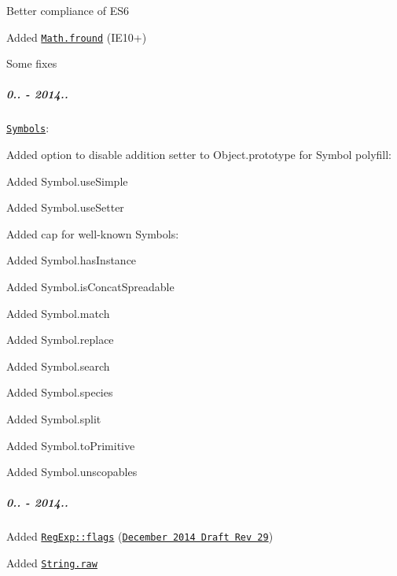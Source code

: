 \begin{DoxyItemize}
\item Better compliance of E\+S6
\item Added \href{https://github.com/zloirock/core-js/#ecmascript-6-math}{\tt {\ttfamily Math.\+fround}} (I\+E10+)
\item Some fixes
\end{DoxyItemize}

\subparagraph*{0.. -\/ 2014..}


\begin{DoxyItemize}
\item \href{https://github.com/zloirock/core-js/#ecmascript-6-symbol}{\tt Symbols}\+:
\begin{DoxyItemize}
\item Added option to disable addition setter to {\ttfamily Object.\+prototype} for Symbol polyfill\+:
\begin{DoxyItemize}
\item Added {\ttfamily Symbol.\+use\+Simple}
\item Added {\ttfamily Symbol.\+use\+Setter}
\end{DoxyItemize}
\item Added cap for well-\/known Symbols\+:
\begin{DoxyItemize}
\item Added {\ttfamily Symbol.\+has\+Instance}
\item Added {\ttfamily Symbol.\+is\+Concat\+Spreadable}
\item Added {\ttfamily Symbol.\+match}
\item Added {\ttfamily Symbol.\+replace}
\item Added {\ttfamily Symbol.\+search}
\item Added {\ttfamily Symbol.\+species}
\item Added {\ttfamily Symbol.\+split}
\item Added {\ttfamily Symbol.\+to\+Primitive}
\item Added {\ttfamily Symbol.\+unscopables}
\end{DoxyItemize}
\end{DoxyItemize}
\end{DoxyItemize}

\subparagraph*{0.. -\/ 2014..}


\begin{DoxyItemize}
\item Added \href{https://github.com/zloirock/core-js/#ecmascript-6-regexp}{\tt {\ttfamily Reg\+Exp\+::flags}} (\href{http://wiki.ecmascript.org/doku.php?id=harmony:specification_drafts#december_6_2014_draft_rev_29}{\tt December 2014 Draft Rev 29})
\item Added \href{https://github.com/zloirock/core-js/#ecmascript-6-string}{\tt {\ttfamily String.\+raw}}
\end{DoxyItemize}

